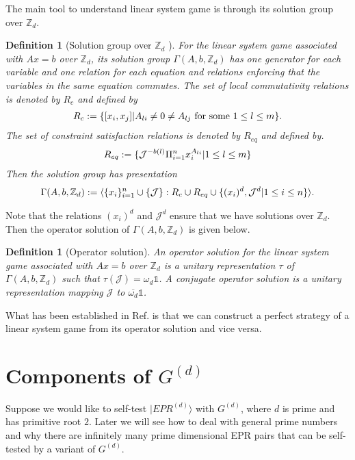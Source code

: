 \documentclass[11pt,letterpaper]{article}
\newcommand{\ket}[1]{|#1\rangle}
\DeclarePairedDelimiter{\set}{\lbrace}{\rbrace}
\DeclarePairedDelimiter{\ip}{\langle}{\rangle}
\newcommand{\Z}{\mathbb{Z}}
\newcommand{\1}{\mathbb{1}}
\newcommand{\J}{\mathcal{J}}
\newcommand{\EPR}[1]{EPR^{(#1)}}
\newcommand{\G}[1]{G^{(#1)}}
\newtheorem{definition}[theorem]{Definition}
\theoremstyle{definition}
\begin{document}
The main tool to understand linear system game is through its solution group over $\Z_d$.
\begin{definition}[Solution group over $\Z_d$ \cite{coladan2017}]
	For the linear system game associated with $Ax = b$ over $\Z_d$, its solution group $\Gamma(A,b,\Z_d)$ has 
	one generator for each variable and one relation for each equation and relations enforcing that the variables in the same
	equation commutes. The set of local commutativity relations is denoted by $R_c$ and defined by
	\begin{align}
		R_c := \set{ [x_i, x_j] |  A_{li} \neq 0 \neq A_{lj} \text{ for some } 1 \leq l \leq m}.
	\end{align}
	The set of constraint satisfaction relations is denoted by $R_{eq}$ and defined by.
	\begin{align}
		R_{eq} := \set{ \J^{-b(l)} \Pi_{i=1}^n  x_i^{A_{li}} | 1\leq l\leq m}
	\end{align}
	Then the solution group has presentation 
	\begin{align}
	\Gamma(A,b,\Z_d) := \ip{ \{x_i\}_{i=1}^n \cup \{\J\} : R_c \cup R_{eq} \cup \{ (x_i)^d, \J^d| 1 \leq i \leq n\}}. 
	\end{align}
\end{definition}
Note that the relations $(x_i)^d$ and $\J^d$ ensure that we have solutions over $\Z_d$.
Then the operator solution of $\Gamma(A,b,\Z_d)$ is given below.
\begin{definition}[Operator solution]
	An operator solution for the linear system game associated with $Ax =b$ over $\Z_d$ is a unitary representation
	$\tau$ of $\Gamma(A,b,\Z_d)$ such that $\tau(\J) = \omega_d\1$. A conjugate operator solution is a unitary 
	representation mapping $\J$ to $\overline{\omega_d}\1$.
\end{definition}
What has been established in Ref.\cite{cleve2017,coladan2017} is that we can construct a perfect strategy of a
linear system game from its operator solution and vice versa.
\section{Components of $\G{d}$}
Suppose we would like to self-test $\ket{\EPR{d}}$ with $\G{d}$, where $d$ is prime and has primitive root $2$.
Later we will see how to deal with general prime numbers and why there are infinitely many prime dimensional EPR pairs 
that can be self-tested by a variant of $\G{d}$.
\end{document}
